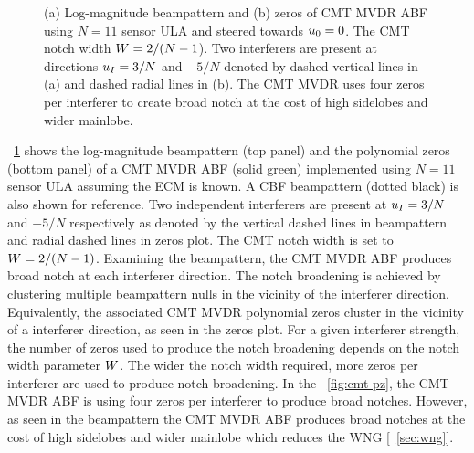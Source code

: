\begin{figure}[!ht]
  \centering
{}


\caption[Beampattern and polynomial zeros of CMT MVDR ABF implemented using $N = 11$ sensor ULA]{(a) Log-magnitude beampattern and (b) zeros of CMT MVDR ABF
  using $N = 11$ sensor ULA and steered towards $u_0 = 0$. The CMT
  notch width $W = 2/(N-1$). Two interferers are present at
  directions $u_I = 3/N$ and $-5/N$ denoted by dashed vertical
  lines in (a) and dashed radial lines in (b). The CMT MVDR uses four
  zeros per interferer to create broad notch at the cost of high
  sidelobes and wider mainlobe.}
\label{fig:cmt-bp-pz}
\end{figure}

\figurename{}~\ref{fig:cmt-bp-pz} shows the log-magnitude beampattern
(top panel) and the polynomial zeros (bottom panel) of a CMT MVDR ABF
(solid green) implemented using $N = 11$ sensor ULA assuming the ECM
is known. A CBF beampattern (dotted black) is also shown for
reference. Two independent interferers are present at $u_I = 3/N$
and $-5/N$ respectively as denoted by the vertical dashed lines in
beampattern and radial dashed lines in zeros plot. The CMT notch width
is set to $W = 2/(N-1)$. Examining the beampattern, the CMT MVDR
ABF produces broad notch at each interferer direction. The notch
broadening is achieved by clustering multiple beampattern nulls in the
vicinity of the interferer direction. Equivalently, the associated CMT
MVDR polynomial zeros cluster in the vicinity of a interferer
direction, as seen in the zeros plot. For a given interferer strength,
the number of zeros used to produce the notch broadening depends on
the notch width parameter $W$. The wider the notch width required,
more zeros per interferer are used to produce notch broadening. In the
\figurename{}~\ref{fig:cmt-pz}, the CMT MVDR ABF is using four zeros
per interferer to produce broad notches. However, as seen in the
beampattern the CMT MVDR ABF produces broad notches at the cost of
high sidelobes and wider mainlobe which reduces the WNG
[\sect{}~\ref{sec:wng}].

